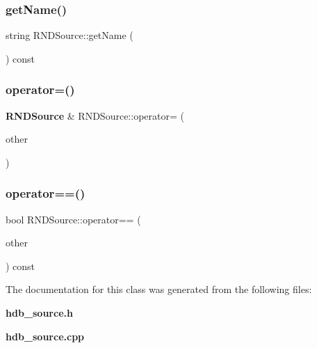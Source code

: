 \subsubsection{getName()}
{\footnotesize\ttfamily string R\+N\+D\+Source\+::get\+Name (\begin{DoxyParamCaption}{ }\end{DoxyParamCaption}) const}

\mbox{\label{classHdbSource_a9a333a2616391ed53aee6b1d803db731}} 
\subsubsection{operator=()}
{\footnotesize\ttfamily \textbf{ R\+N\+D\+Source} \& R\+N\+D\+Source\+::operator= (\begin{DoxyParamCaption}\item[{const \textbf{ R\+N\+D\+Source} \&}]{other }\end{DoxyParamCaption})}

\mbox{\label{classHdbSource_aa91f4b7f83e99b6eeb36cde4f96740af}} 
\subsubsection{operator==()}
{\footnotesize\ttfamily bool R\+N\+D\+Source\+::operator== (\begin{DoxyParamCaption}\item[{const \textbf{ R\+N\+D\+Source} \&}]{other }\end{DoxyParamCaption}) const}



The documentation for this class was generated from the following files\+:\begin{DoxyCompactItemize}
\item 
\textbf{ hdb\+\_\+source.\+h}\item 
\textbf{ hdb\+\_\+source.\+cpp}\end{DoxyCompactItemize}
